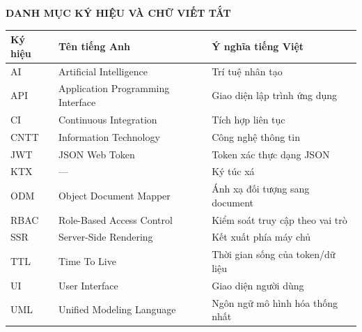 ﻿\documentclass[a4paper,12pt,openany,oneside]{report}
\begin{document}
\clearpage
\tableofcontents

\clearpage
\begin{center}
    {\bfseries\fontsize{18pt}{22pt}\selectfont
        DANH MỤC KÝ HIỆU VÀ CHỮ VIẾT TẮT}
\end{center}
\vspace{1cm}

\begin{longtable}{p{3cm} p{5cm} p{6cm}}
    \toprule
    \textbf{Ký hiệu} & \textbf{Tên tiếng Anh} & \textbf{Ý nghĩa tiếng Việt} \\
    \midrule
    \endhead
    AI   & Artificial Intelligence           & Trí tuệ nhân tạo \\[3pt]
    API  & Application Programming Interface & Giao diện lập trình ứng dụng \\[3pt]
    CI   & Continuous Integration            & Tích hợp liên tục \\[3pt]
    CNTT & Information Technology            & Công nghệ thông tin \\[3pt]
    JWT  & JSON Web Token                    & Token xác thực dạng JSON \\[3pt]
    KTX  & ---                               & Ký túc xá \\[3pt]
    ODM  & Object Document Mapper            & Ánh xạ đối tượng sang document \\[3pt]
    RBAC & Role-Based Access Control         & Kiểm soát truy cập theo vai trò \\[3pt]
    SSR  & Server-Side Rendering             & Kết xuất phía máy chủ \\[3pt]
    TTL  & Time To Live                      & Thời gian sống của token/dữ liệu \\[3pt]
    UI   & User Interface                    & Giao diện người dùng \\[3pt]
    UML  & Unified Modeling Language         & Ngôn ngữ mô hình hóa thống nhất \\
    \bottomrule
\end{longtable}

\clearpage
\renewcommand{\listfigurename}{%
    \bfseries\fontsize{18pt}{22pt}\selectfont DANH MỤC HÌNH VẼ%
}
\listoffigures

\clearpage
\renewcommand{\listtablename}{%
    \bfseries\fontsize{18pt}{22pt}\selectfont DANH MỤC BẢNG%
}
\listoftables
\end{document}
